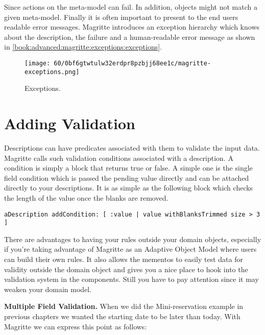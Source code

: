 \documentclass[a4paper,10pt,twoside]{book}
\begin{document}
Since actions on the meta-model can fail. In addition, objects might not match a given meta-model. Finally it is often important to present to the end users readable error messages. Magritte introduces an exception hierarchy which knows about the description, the failure and a human-readable error message as shown in \autoref{book:advanced:magritte:exceptions:exceptions}.

\begin{figure}[h!tbp]
	\begin{center}
		\texttt{[image: 60/0bf6gtwtulw32erdpr8pzbjj68ee1c/magritte-exceptions.png]}
		\caption{Exceptions.\label{book:advanced:magritte:exceptions:exceptions}}
	\end{center}
\end{figure}


\section{Adding Validation}
\label{book:advanced:magritte:validation}

Descriptions can have predicates associated with them to validate the input data. Magritte calls such validation conditions associated with a description. A condition is simply a block that returns true or false. A simple one is the single field condition which is passed the pending value directly and can be attached directly to your descriptions. It is as simple as the following block which checks the length of the value once the blanks are removed.

\begin{lstlisting}
aDescription addCondition: [ :value | value withBlanksTrimmed size > 3 ] 
\end{lstlisting}

There are advantages to having your rules outside your domain objects, especially if you're taking advantage of Magritte as an Adaptive Object Model where users can build their own rules. 
It also allows the mementos to easily test data for validity outside the domain object and gives you a nice place to hook into the validation system in the  components. Still you have to pay attention since it may weaken your domain model. 

\textbf{Multiple Field Validation.} When we did the Mini-reservation example in previous chapters we wanted the starting date to be later than today. With Magritte we can express this point as follows: 
\end{document}
